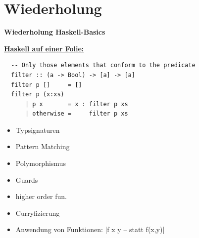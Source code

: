 \documentclass[unknownkeysallowed]{beamer}
\begin{document}

\section{Wiederholung}
\begin{frame}
\begin{center}
\Large\textbf{Wiederholung Haskell-Basics}
\end{center}
\end{frame}

  
  \begin{frame}[fragile]
  
  \begin{center}
  \Large\textbf{\underline{Haskell auf einer Folie:}} \normalsize
  \end{center}

  \begin{verbatim}
  -- Only those elements that conform to the predicate
  filter :: (a -> Bool) -> [a] -> [a]
  filter p []     = []
  filter p (x:xs) 
      | p x       = x : filter p xs
      | otherwise =     filter p xs
  \end{verbatim}
  
  \begin{multicols}{2}
  \begin{itemize}
  \item Typsignaturen    \pause
  \item Pattern Matching \pause
  \item Polymorphismus   \pause
  \end{itemize}
  
  \columnbreak
  
  \begin{itemize}
  \item Guards            \pause
  \item higher order fun. \pause
  \item Curryfizierung    \pause
  \end{itemize}

  \end{multicols}
  

  \begin{itemize}
  \item Anwendung von Funktionen: |f x y -- statt f(x,y)|
  \end{itemize}
  
\end{frame}
  
\end{document}

